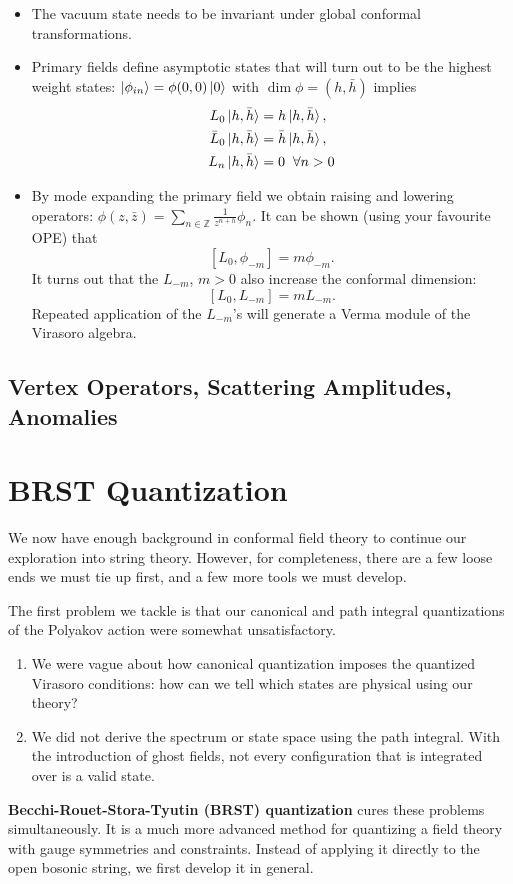 \documentclass{report}
\theoremstyle{plain}
\theoremstyle{definition}
\theoremstyle{remark}
\newcommand{\FR}[2]{\frac{#1}{#2}}
\newcommand{\bZ}{\mathbb{Z}}
\begin{document}
\begin{itemize}
    \item The vacuum state needs to be invariant under global conformal
        transformations.  
    \item Primary fields define asymptotic states that will turn out to be
        the highest weight states: $\ket{\phi_{in}} = \phi(0,0)\ket 0$ with
        $\dim \phi = (h,\bar h)$ implies 
        \begin{align*}
            L_0\ket{h,\bar h} &= h \ket{h,\bar h},\\
            \bar L_0\ket{h,\bar h} &= \bar h \ket{h,\bar h},\\ 
            L_n\ket{h,\bar h} &= 0\;\;\forall n>0
        \end{align*}
    \item By mode expanding the primary field we obtain raising and
        lowering operators: $\phi(z,\bar z) = \sum_{n\in\bZ}
        \FR{1}{z^{n+h}} \phi_n$. It can be shown (using your favourite OPE)
        that \[ [L_0,\phi_{-m}] = m\phi_{-m}.\] It turns out that the
        $L_{-m}$, $m>0$ also increase the conformal dimension:
        \[ [L_0,L_{-m}]=mL_{-m}.\]
        Repeated application of the $L_{-m}$'s will generate a Verma module
        of the Virasoro algebra.
\end{itemize}


\section{Vertex Operators, Scattering Amplitudes, Anomalies}

\chapter{BRST Quantization}

We now have enough background in conformal field theory to continue
our exploration into string theory. However, for completeness, there
are a few loose ends we must tie up first, and a few more tools we
must develop.

The first problem we tackle is that our canonical and path integral
quantizations of the Polyakov action were somewhat unsatisfactory.
\begin{enumerate}
\item We were vague about how canonical quantization imposes the
  quantized Virasoro conditions: how can we tell which states are
  physical using our theory?
\item We did not derive the spectrum or state space using the path
  integral. With the introduction of ghost fields, not every
  configuration that is integrated over is a valid state.
\end{enumerate}
{\bf Becchi-Rouet-Stora-Tyutin (BRST) quantization} cures these
problems simultaneously. It is a much more advanced method for
quantizing a field theory with gauge symmetries and constraints.
Instead of applying it directly to the open bosonic string, we first
develop it in general.
\end{document}
